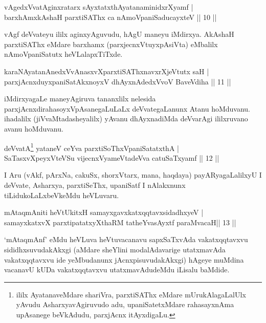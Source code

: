 
\begin{shl}
vAgedxVvatA\s ginxratarx sAyxtatxthA\s \s yatanaminidxrXyamf |\\
barxhAmx\s \s kAshaH parxtiSAThx ca nAmoVpaniSaducayxteV \hfill || 10 || 
\end{shl}

\begin{artha}
vAgf deVvateyu ililx aginxyAguvudu, hAgU maneyu iMdirxya.  AkAshaH parxtiSAThx eMdare barxhamx (parxjecnxVtuyxpAsiVta) eMbalilx nAmoVpaniSatutx heVLalapxTiTxde.
\end{artha}


\begin{shl}
karaNAyatanAnedxVvAnasxvXparxtiSAThxnavxrXjeVtutx saH |\\
parxjAcnxduyxpaniSatAkxnoyxV dhAyxnAdedxVvoV BaveVdiha \hfill || 11 || 
\end{shl}

\begin{artha}
iMdirxyagaLe maneyAgiruva tananxlilx nelesida parxjAcnxdi\break rahasoyxVpAsanegaLuLaLx deVvategaLanunx Atanu hoMduvanu. ihadalilx (jiVvaMtadasheyalilx) yAvanu dhAyxnadiMda deVvarAgi ililxruvano avanu hoMduvanu.
\end{artha}

\begin{shl}
deVvatA\s\footnote{ililx AyatanaveMdare shariVra, parxtiSAThx eMdare mUrukAlagaLalUlx yAvudu AsharxyavAgiruvudo adu, upaniSatetxMdare rahasayxnAma upAsanege beVkAdudu, parxjAcnx itAyxdigaLu. } yataneV ceYva parxtiSoThxVpaniSatatxthA |\\
SaTasxvXpeyxVteVSu vijecnxVyameVtadeVva catuSaTxyamf \hfill || 12 || 
\end{shl}

\begin{artha}
I Aru (vAkf, pArxNa, cakuSx, shorxVtarx, mana, haqdaya) payARyagaLalilxyU I deVvate, Asharxya, parxtiSeThx, upaniSatf I nAlakxnunx tiLidukoLaLxbeVkeMdu heVLuvaru.
\end{artha}

\begin{shl}
mAtaqmAniti heVtUkitxH samayxgavxkatxqqtavxsidadhxyeV |\\
samayxkatxvX parxtipatatxyXthaRM tatheYvasAyxtf paraMvacaH\hfill || 13 ||
\end{shl}

\begin{artha}
`mAtaqmAnf' eMdu heVLuva heVtuvacanavu sapxSaTxvAda vakatxqqtavxvu sididhxsuvudakAkxgi (aMdare sheYlini modalAdavarige utatxmavAda vakatxqqtavxvu ide yeMbudanunx jAcnxpisuvudakAkxgi) hAgeye muMdina vacanavU kUDa vakatxqqtavxvu utatxmavAdudeMdu iLisalu baMdide.
\end{artha}

